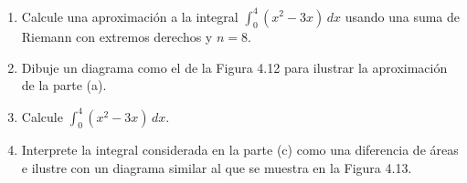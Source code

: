 \item 
\begin{enumerate}
    \item[(a)] Calcule una aproximación a la integral $\int_0^4 (x^2 - 3x) \, dx$ usando una suma de Riemann con extremos derechos y $n = 8$.
    \item[(b)] Dibuje un diagrama como el de la Figura 4.12 para ilustrar la aproximación de la parte (a).
    \item[(c)] Calcule $\int_0^4 (x^2 - 3x) \, dx$.
    \item[(d)] Interprete la integral considerada en la parte (c) como una diferencia de áreas e ilustre con un diagrama similar al que se muestra en la Figura 4.13.
\end{enumerate}
